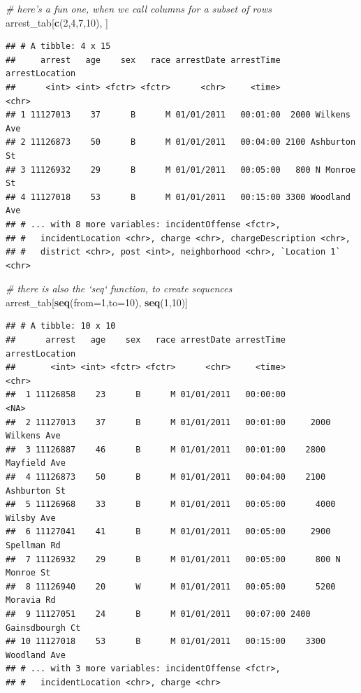 \documentclass[12pt,]{book}
\newenvironment{Shaded}{\begin{snugshade}}{\end{snugshade}}
\newcommand{\KeywordTok}[1]{\textcolor[rgb]{0.13,0.29,0.53}{\textbf{#1}}}
\newcommand{\DataTypeTok}[1]{\textcolor[rgb]{0.13,0.29,0.53}{#1}}
\newcommand{\DecValTok}[1]{\textcolor[rgb]{0.00,0.00,0.81}{#1}}
\newcommand{\CommentTok}[1]{\textcolor[rgb]{0.56,0.35,0.01}{\textit{#1}}}
\newcommand{\NormalTok}[1]{#1}
\theoremstyle{definition}
\theoremstyle{definition}
\theoremstyle{remark}
\begin{document}
\begin{Shaded}
\begin{Highlighting}[]
\CommentTok{# here's a fun one, when we call columns for a subset of rows}
\NormalTok{arrest_tab[}\KeywordTok{c}\NormalTok{(}\DecValTok{2}\NormalTok{,}\DecValTok{4}\NormalTok{,}\DecValTok{7}\NormalTok{,}\DecValTok{10}\NormalTok{), ]}
\end{Highlighting}
\end{Shaded}

\begin{verbatim}
## # A tibble: 4 x 15
##     arrest   age    sex   race arrestDate arrestTime    arrestLocation
##      <int> <int> <fctr> <fctr>      <chr>     <time>             <chr>
## 1 11127013    37      B      M 01/01/2011   00:01:00  2000 Wilkens Ave
## 2 11126873    50      B      M 01/01/2011   00:04:00 2100 Ashburton St
## 3 11126932    29      B      M 01/01/2011   00:05:00   800 N Monroe St
## 4 11127018    53      B      M 01/01/2011   00:15:00 3300 Woodland Ave
## # ... with 8 more variables: incidentOffense <fctr>,
## #   incidentLocation <chr>, charge <chr>, chargeDescription <chr>,
## #   district <chr>, post <int>, neighborhood <chr>, `Location 1` <chr>
\end{verbatim}

\begin{Shaded}
\begin{Highlighting}[]
\CommentTok{# there is also the `seq` function, to create sequences}
\NormalTok{arrest_tab[}\KeywordTok{seq}\NormalTok{(}\DataTypeTok{from=}\DecValTok{1}\NormalTok{,}\DataTypeTok{to=}\DecValTok{10}\NormalTok{), }\KeywordTok{seq}\NormalTok{(}\DecValTok{1}\NormalTok{,}\DecValTok{10}\NormalTok{)]}
\end{Highlighting}
\end{Shaded}

\begin{verbatim}
## # A tibble: 10 x 10
##      arrest   age    sex   race arrestDate arrestTime       arrestLocation
##       <int> <int> <fctr> <fctr>      <chr>     <time>                <chr>
##  1 11126858    23      B      M 01/01/2011   00:00:00                 <NA>
##  2 11127013    37      B      M 01/01/2011   00:01:00     2000 Wilkens Ave
##  3 11126887    46      B      M 01/01/2011   00:01:00    2800 Mayfield Ave
##  4 11126873    50      B      M 01/01/2011   00:04:00    2100 Ashburton St
##  5 11126968    33      B      M 01/01/2011   00:05:00      4000 Wilsby Ave
##  6 11127041    41      B      M 01/01/2011   00:05:00     2900 Spellman Rd
##  7 11126932    29      B      M 01/01/2011   00:05:00      800 N Monroe St
##  8 11126940    20      W      M 01/01/2011   00:05:00      5200 Moravia Rd
##  9 11127051    24      B      M 01/01/2011   00:07:00 2400 Gainsdbourgh Ct
## 10 11127018    53      B      M 01/01/2011   00:15:00    3300 Woodland Ave
## # ... with 3 more variables: incidentOffense <fctr>,
## #   incidentLocation <chr>, charge <chr>
\end{verbatim}
\end{document}
